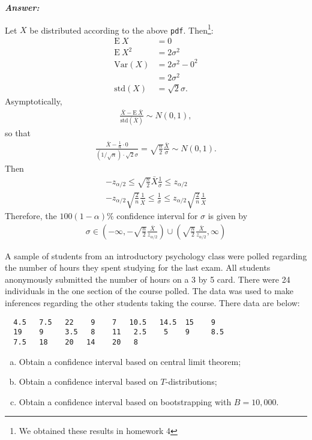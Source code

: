 \documentclass[12pt]{article}
\newenvironment{question}[2][Question]{\begin{trivlist}
\item[\hskip \labelsep {\bfseries #1}\hskip \labelsep {\bfseries #2.}]}{\end{trivlist}}
\begin{document}
  \textbf{\color{TealBlue}\emph{Answer:} } 

\bigskip
Let $X$ be distributed according to the above \texttt{pdf}. Then\footnote{We obtained these results in homework 4}:
\begin{align*}
\mathrm{E}\ X &= 0\\
\mathrm{E} \ X^2 &= 2 \sigma^2\\
\mathrm{Var}(X) &= 2 \sigma^2 - 0^2 \\
&=  2 \sigma^2 \\
\mathrm{std} (X) &=\sqrt2 \sigma.
\end{align*}
Asymptotically,
\begin{align*}
\frac{\bar X - \mathrm{E}\ \bar X} {\mathrm{std} (\bar X)}  \sim N(0, 1),
\end{align*}
so that 
\begin{align*}
\frac{\bar X - \frac{1}{n} \cdot 0} {(1/\sqrt n) \cdot \sqrt 2 \sigma}  = \sqrt{\frac{n}{2}} \frac{\bar X} {\sigma} \sim N(0, 1).
\end{align*}
Then
\begin{align*}
-z_{\alpha/2} \leq  \sqrt{\frac{n}{2}} \bar X \frac{1} {\sigma} \leq z_{\alpha/2} \\
-z_{\alpha/2} \sqrt{\frac{2}{n}}\frac{1}{\bar X} \leq \frac{1} {\sigma}  \leq z_{\alpha/2} \sqrt{\frac{2}{n}}\frac{1}{\bar X}
\end{align*}
Therefore, the $100(1 - \alpha)\%$ confidence interval for $\sigma$ is given by
\begin{align*}
\sigma \in \left( -\infty,  -\sqrt{\frac{n}{2}} \frac{\bar X }{z_{\alpha/2 }}\right)  \cup \left(\sqrt{\frac{n}{2}} \frac{\bar X }{z_{\alpha/2 }}, \infty \right) 
\end{align*}
\bigskip
\bigskip
 \begin{question}{8.3} A sample of students from an introductory psychology class were polled regarding 
 the number
of hours they spent studying for the last exam. All students anonymously submitted the number
of hours on a 3 by 5 card. There were 24 individuals in the one section of the course polled. The
data was used to make inferences regarding the other students taking the course. There data are
below:
\begin{verbatim}
  4.5   7.5   22    9    7   10.5   14.5  15    9
  19    9     3.5   8    11   2.5    5    9     8.5 
  7.5   18    20   14    20   8
\end{verbatim}
\begin{enumerate}[(a)]
\item Obtain a confidence interval based on central limit theorem;
\item Obtain a confidence interval based on $T$-distributions;
\item Obtain a confidence interval based on bootstrapping with $B=10,000.$
\end{enumerate}

\end{question} 
\end{document}
